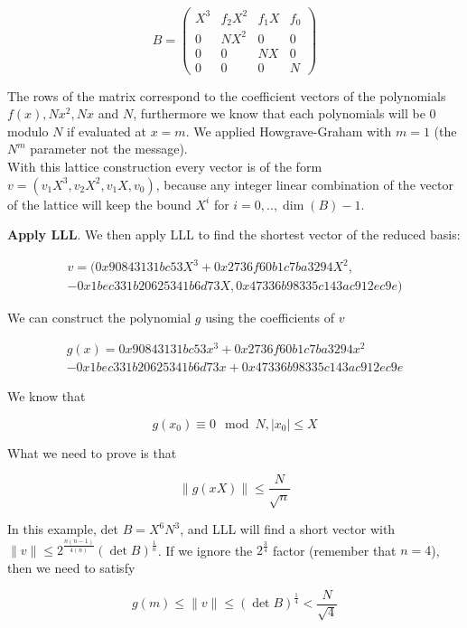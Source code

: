 \documentclass[a4paper,12pt]{report}
\begin{document}
\[
B = 
\begin{pmatrix}
    X^3 & f_2X^2 & f_1X & f_0 \\
    0 & NX^2 & 0 & 0 \\
    0 & 0 & NX & 0 \\
    0 & 0 & 0 & N
\end{pmatrix}
\] 

The rows of the matrix correspond to the coefficient vectors of the polynomials $f(x), Nx^2, Nx$ and $N$, furthermore we know
that each polynomials will be 0 modulo $N$ if evaluated at $x = m$.
We applied Howgrave-Graham with $m=1$ (the $N^m$ parameter not the message).\\
With this lattice construction every vector is of the form $v = (v_1X^3, v_2X^2, v_1X, v_0)$, because any
integer linear combination of the vector of the lattice will keep the bound $X^i$ for $i=0,..,\dim(B)-1$.

\textbf{Apply LLL}. We then apply LLL to find the shortest vector of the reduced basis:

\[
    \begin{split}
    v = (0x90843131bc53X^3 + 0x2736f60b1c7ba3294X^2, \\
    -0x1bec331b20625341b6d73X, 0x47336b98335c143ac912ec9e)
    \end{split}
\]

We can construct the polynomial $g$ using the coefficients of $v$

\[
    \begin{split}
        g(x) = 0x90843131bc53x^3 + 0x2736f60b1c7ba3294x^2 \\
        -0x1bec331b20625341b6d73x + 0x47336b98335c143ac912ec9e
    \end{split}
\]

We know that

\[
    g(x_0) \equiv 0 \mod N, |x_0| \le X
\]

What we need to prove is that

\[
    \lVert g(xX) \rVert \le \frac{N}{\sqrt{n}}
\] 

In this example, det $B = X^6N^3$, and LLL will find a short vector with $\lVert v \rVert \le 2^{\frac{n(n-1)}{4(n)}} (\det B)^{\frac{1}{n}}$.
If we ignore the $2^{\frac{3}{4}}$ factor (remember that $n = 4$), then we need to satisfy

\[
    g(m) \le \lVert v \rVert \le (\det B)^{\frac{1}{4}} < \frac{N}{\sqrt{4}}
\] 

\vspace*{10px}
\end{document}
